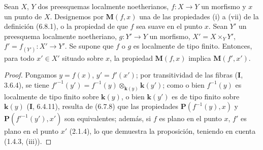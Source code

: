 \begin{proposition}[6.8.2]
\label{IV.2.s6.8.2-fr}
Sean $X$, $Y$ dos preesquemas localmente noetherianos, $f:X\to Y$ un
morfismo y $x$ un punto de $X$. Designemos por $\boldsymbol{M}(f,x)$ una de las propiedades
\textup{(i)} a \textup{(vii)} de la definición \textup{(6.8.1)}, o la propiedad de que $f$ sea suave en el
punto $x$. Sean $Y'$ un preesquema localmente noetheriano, $g:Y'\to Y$ un
morfismo, $X'=X\times_Y Y'$, $f'=f_{(Y')}:X'\to Y'$. Se supone que $f$
o $g$ es localmente de tipo finito. Entonces, para todo $x'\in X'$ situado
sobre $x$, la propiedad $\boldsymbol{M}(f,x)$ implica $\boldsymbol{M}(f',x')$.
\end{proposition}

\begin{proof}
Pongamos $y=f(x)$, $y'=f'(x')$; por transitividad de las fibras (\textbf I, 3.6.4),
se tiene
$f'^{-1}(y')=f^{-1}(y)\otimes_{\mathbf{k}(y)}\boldsymbol{k}(y')$; como o bien $f^{-1}(y)$ es localmente de tipo finito sobre $\boldsymbol{k}(y)$, o bien
$\boldsymbol{k}(y')$ es de tipo finito sobre $\boldsymbol{k}(y)$ (\textbf I, 6.4.11), resulta de (6.7.8) que
las propiedades $\boldsymbol{P}(f^{-1}(y),x)$ y $\boldsymbol{P}(f'^{-1}(y'),x')$ son equivalentes;
además, si $f$ es plano en el punto $x$, $f'$ es plano en el punto $x'$
(2.1.4), lo que demuestra la proposición, teniendo en cuenta (1.4.3, (iii)).
\end{proof}
